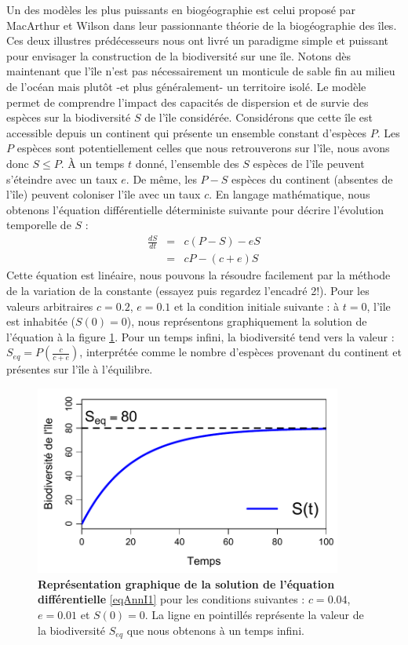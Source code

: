 Un des modèles les plus puissants en biogéographie est celui proposé par MacArthur et Wilson dans leur passionnante théorie de la biogéographie des îles. Ces deux illustres prédécesseurs nous ont livré un paradigme simple et puissant pour envisager la construction de la biodiversité sur une île. Notons dès maintenant que l'île n'est pas nécessairement un monticule de sable fin au milieu de l'océan mais plutôt -et plus généralement- un territoire isolé. Le modèle permet de comprendre l'impact des capacités de dispersion et de survie des espèces sur la biodiversité $S$ de l'île considérée. Considérons que cette île est accessible depuis un continent qui présente un ensemble constant d'espèces $P$. Les $P$ espèces sont potentiellement celles que nous retrouverons sur l'île, nous avons donc $S\leqslant P$. À un temps $t$ donné, l'ensemble des $S$ espèces de l'île peuvent s'éteindre avec un taux $e$. De même, les $P-S$ espèces du continent (absentes de l'île) peuvent coloniser l'île avec un taux $c$. En langage mathématique, nous obtenons l'équation différentielle déterministe suivante pour décrire l'évolution temporelle de $S$ :
\begin{eqnarray}
\nonumber \frac{dS}{dt}&=&c(P-S)-eS\\
\label{eqAnnI1} &=&cP-(c+e)S
\end{eqnarray}
Cette équation est linéaire, nous pouvons la résoudre facilement par la méthode de la variation de la constante (essayez puis regardez l'encadré 2!). Pour les valeurs arbitraires $c=0.2$, $e=0.1$ et la condition initiale suivante : à $t=0$, l'île est inhabitée ($S(0)=0$), nous représentons graphiquement la solution de l'équation à la figure \ref{figAnnI1}. Pour un temps infini, la biodiversité tend vers la valeur : $S_{eq}=P\left(\frac{c}{c+e}\right)$, interprétée comme le nombre d'espèces provenant du continent et présentes sur l'île à l'équilibre.

\begin{figure}[h!]
\centering
\includegraphics[width=0.9\textwidth]{annexe1/fig/figAnnI1.pdf}
\caption[Représentation graphique de la solution de l'équation différentielle]{\textbf{Représentation graphique de la solution de l'équation différentielle} \eqref{eqAnnI1} pour les conditions suivantes : $c=0.04$, $e=0.01$ et $S(0)=0$. La ligne en pointillés représente la valeur de la biodiversité $S_{eq}$ que nous obtenons à un temps infini.}
\label{figAnnI1}
\end{figure}



